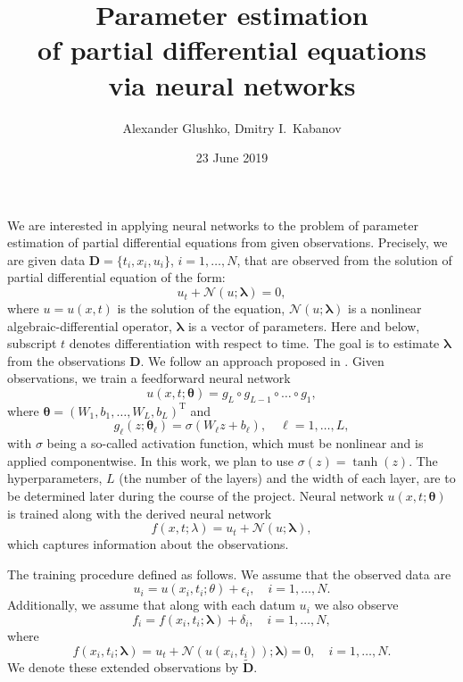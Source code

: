 \documentclass[a4paper, 12pt, english, parskip]{scrartcl}
\title{\vspace{-0.5cm}Parameter estimation\\of partial differential equations\\via neural networks}
\author{Alexander Glushko, Dmitry I.\ Kabanov}
\date{23 June 2019}
\newcommand{\Data}{\vec{D}}
\newcommand{\DataExt}{\widetilde{\vec{D}}}
\newcommand{\T}{\ensuremath{\text{T}}}
\renewcommand{\vec}[1]{\boldsymbol{#1}}
\newcommand{\VTheta}{\ensuremath{\vec{\theta}}}
\newcommand{\VLambda}{\ensuremath{\vec{\lambda}}}
\begin{document}
\maketitle

We are interested in applying neural networks to the problem of parameter
estimation of partial differential equations from given observations.
Precisely, we are given data $\Data = \{t_i, x_i, u_i\}$, \(i=1,\dots,N\), that are
observed from the solution of partial differential equation of the form:
\begin{equation}
    u_t + \mathcal N(u; \vec{\lambda}) = 0,
\end{equation}
where  \(u=u(x, t)\) is the solution of the equation,
\(\mathcal N(u; \VLambda)\) is a nonlinear algebraic-differential operator,
\(\vec{\lambda}\) is a vector of parameters.
Here and below, subscript \(t\) denotes differentiation with respect to time.
The goal is to estimate \(\VLambda\) from the observations \(\Data\).
We follow an approach proposed in \cite{raissi2017pinnII}.
Given observations, we train a feedforward neural network \cite{goodfellow2016deep}
\begin{equation}
u(x, t; \vec{\theta}) = g_L \circ g_{L-1} \circ \dots \circ g_1,
\end{equation}
where \( \vec{\theta} = \left( W_1, b_1, \dots, W_L, b_L\right)^\T \) and
\[
    g_\ell(z; \VTheta_\ell) = \sigma (W_\ell z + b_\ell), \quad \ell = 1,\dots,L,
\]
with \(\sigma\) being a so-called activation function, which must be nonlinear
and is applied componentwise. In this work, we plan to use \( \sigma(z) = \tanh
(z) \). The hyperparameters, $L$ (the number of the layers) and the width of each
layer, are to be determined later during the course of the project.
Neural network \(u(x, t; \VTheta)\) is trained along with the derived neural
network
\begin{equation}
    f(x, t; \lambda) = u_t + \mathcal N(u; \VLambda),
\end{equation}
which captures information about the observations.

The training procedure defined as follows.
We assume that the observed data are
\begin{equation}
    u_i = u(x_i, t_i; \theta) + \epsilon_i, \quad i=1,\dots,N.
\end{equation}
Additionally, we assume that along with each datum $u_i$ we also observe
\begin{equation}
    f_i = f(x_i, t_i; \VLambda) + \delta_i, \quad i=1, \dots, N,
\end{equation}
where
\begin{equation}
    f(x_i, t_i; \VLambda) = u_t + \mathcal N(u(x_i, t_i)); \VLambda) = 0, \quad
    i = 1,\dots,N.
\end{equation}
We denote these extended observations by $\DataExt$.
\end{document}
